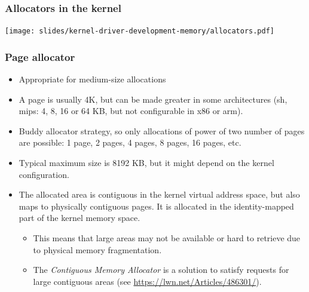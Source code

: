 \begin{frame}
  \frametitle{Allocators in the kernel}
  \begin{center}
    \texttt{[image: slides/kernel-driver-development-memory/allocators.pdf]}
  \end{center}
\end{frame}

\begin{frame}[fragile]
  \frametitle{Page allocator}
  \begin{itemize}
  \item Appropriate for medium-size allocations
  \item A page is usually 4K, but can be made greater in some
    architectures (sh, mips: 4, 8, 16 or 64 KB, but not configurable in
    x86 or arm).
  \item Buddy allocator strategy, so only allocations of power of two
    number of pages are possible: 1 page, 2 pages, 4 pages, 8 pages,
    16 pages, etc.
  \item Typical maximum size is 8192 KB, but it might depend on the
    kernel configuration.
  \item The allocated area is contiguous in the kernel virtual address
    space, but also maps to physically contiguous pages. It is
    allocated in the identity-mapped part of the kernel memory space.
    \begin{itemize}
    \item This means that large areas may not be available or hard to
      retrieve due to physical memory fragmentation.
    \item The {\em Contiguous Memory Allocator} is a solution to
	  satisfy requests for large contiguous areas (see
          \url{https://lwn.net/Articles/486301/}).
    \end{itemize}
  \end{itemize}
\end{frame}

